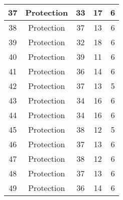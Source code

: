 \documentclass[results.tex]{subfiles}
\begin{document}
\begin{center}
\begin{tabular}{| c || c | c | c | c |}
            \hline
            37                      & Protection                   & 33                     & 17                      & 6                    \\
            \hline
            38                      & Protection                   & 37                     & 13                      & 6                    \\
            \hline
            39                      & Protection                   & 32                     & 18                      & 6                    \\
            \hline
            40                      & Protection                   & 39                     & 11                      & 6                    \\
            \hline
            41                      & Protection                   & 36                     & 14                      & 6                    \\
            \hline
            42                      & Protection                   & 37                     & 13                      & 5                    \\
            \hline
            43                      & Protection                   & 34                     & 16                      & 6                    \\
            \hline
            44                      & Protection                   & 34                     & 16                      & 6                    \\
            \hline
            45                      & Protection                   & 38                     & 12                      & 5                    \\
            \hline
            46                      & Protection                   & 37                     & 13                      & 6                    \\
            \hline
            47                      & Protection                   & 38                     & 12                      & 6                    \\
            \hline
            48                      & Protection                   & 37                     & 13                      & 6                    \\
            \hline
            49                      & Protection                   & 36                     & 14                      & 6                    \\
            \hline
        \end{tabular}
    \end{center}
\end{document}
